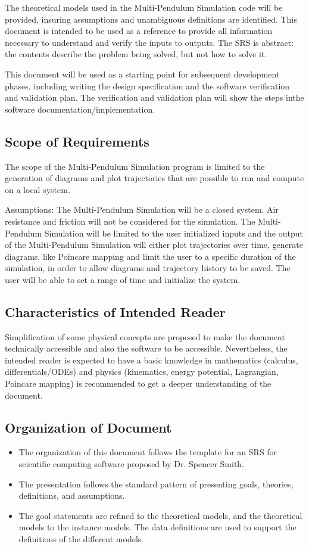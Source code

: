 \documentclass[12pt]{article}
\newcommand{\progname}{Multi-Pendulum Simulation }
\begin{document}
The theoretical models used in the \progname code will be provided, insuring
assumptions and unambiguous definitions are identified. This document 
is intended to be used as a reference to provide all information necessary to 
understand and verify the inputs to outputs. The SRS is abstract: the contents 
describe the problem being solved, but not how to solve it.

This document will be used as a starting point for subsequent development
phases, including writing the design specification and the software
verification and validation plan. The verification and validation plan will show
the steps inthe software documentation/implementation.

\subsection{Scope of Requirements} 

The scope of the \progname program is limited to the generation 
of diagrams and plot trajectories that are possible to run and compute on a
local system.

Assumptions: The \progname will be a closed system. Air resistance and friction
will
not be considered for the simulation. The \progname will be limited to the user
initialized inputs and
the output of the \progname will either plot trajectories over time, generate
diagrams, like Poincare mapping
and limit the user to a specific duration of the simulation, in order to allow
diagrams and trajectory history to be saved.
The user will be able to set a range of time and initialize the system. \\

\subsection{Characteristics of Intended Reader} 
Simplification of some physical concepts are proposed to make the document
technically accessible and also the software to be accessible.
Nevertheless, the intended reader is expected to have a basic knowledge in
mathematics (calculus, differentials/ODEs) and physics (kinematics, energy
potential, Lagrangian, Poincare mapping) is recommended to get a deeper
understanding of the document.

\subsection{Organization of Document}
\begin{itemize}
\item The organization of this document follows the template for an SRS for
scientific
computing software proposed by Dr. Spencer Smith. 
\item The presentation follows the standard pattern of presenting goals,
theories, definitions, and assumptions.
\item The goal statements are refined to the theoretical models, and the
theoretical
models to the instance models. The data definitions are used to support the
definitions of the different models.
\end{itemize}
\newpage
\end{document}
